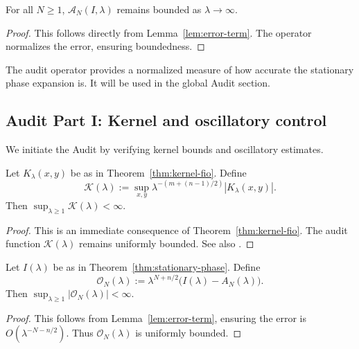 \begin{lemma}
\label{lem:audit-bound}
For all $N \geq 1$, $\mathcal{A}_N(I,\lambda)$ remains bounded as $\lambda \to \infty$.
\end{lemma}

\begin{proof}
This follows directly from Lemma~\ref{lem:error-term}. The operator normalizes the error, ensuring boundedness.
\end{proof}

\begin{remark}
The audit operator provides a normalized measure of how accurate the stationary phase expansion is. It will be used in the global Audit section.
\end{remark}

\medskip

\subsection*{Audit Part I: Kernel and oscillatory control}
\label{appB:audit-I}

We initiate the Audit by verifying kernel bounds and oscillatory estimates.

\begin{proposition}
\label{prop:audit-kernel}
Let $K_\lambda(x,y)$ be as in Theorem~\ref{thm:kernel-fio}. Define
\[
\mathcal{K}(\lambda) := \sup_{x,y} \lambda^{-(m+(n-1)/2)} |K_\lambda(x,y)|.
\]
Then $\sup_{\lambda \geq 1} \mathcal{K}(\lambda) < \infty$.
\end{proposition}

\begin{proof}
This is an immediate consequence of Theorem~\ref{thm:kernel-fio}. The audit function $\mathcal{K}(\lambda)$ remains uniformly bounded. See also \cite{HormanderI}.
\end{proof}

\begin{proposition}
\label{prop:audit-osc}
Let $I(\lambda)$ be as in Theorem~\ref{thm:stationary-phase}. Define
\[
\mathcal{O}_N(\lambda) := \lambda^{N+n/2} \big( I(\lambda) - A_N(\lambda) \big).
\]
Then $\sup_{\lambda \geq 1} |\mathcal{O}_N(\lambda)| < \infty$.
\end{proposition}

\begin{proof}
This follows from Lemma~\ref{lem:error-term}, ensuring the error is $O(\lambda^{-N-n/2})$. Thus $\mathcal{O}_N(\lambda)$ is uniformly bounded.
\end{proof}

